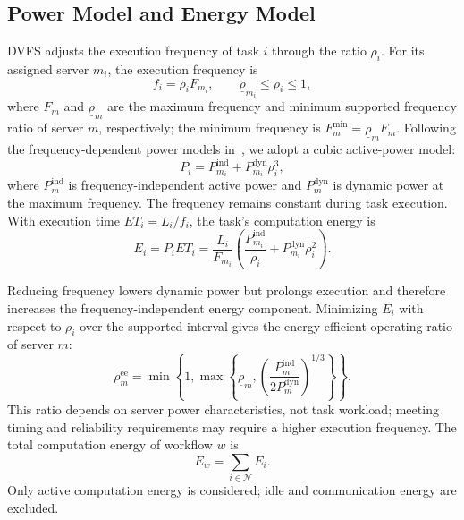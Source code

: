 \documentclass[10pt,twocolumn]{article}
\begin{document}
\subsection{Power Model and Energy Model}
\label{subsec:energy_model}

DVFS adjusts the execution frequency of task $i$ through the ratio
$\rho_i$. For its assigned server $m_i$, the execution frequency is
\begin{equation}
 f_i=\rho_iF_{m_i},\qquad \underline\rho_{m_i}\leq\rho_i\leq1,
 \label{eq:task_frequency}
\end{equation}
where $F_m$ and $\underline\rho_m$ are the maximum frequency and minimum
supported frequency ratio of server $m$, respectively; the minimum
frequency is $F_m^{\min}=\underline\rho_m F_m$.
Following the frequency-dependent power models
in~\cite{xie2017energy,zhu2006energy}, we adopt a cubic active-power model:
\begin{equation}
 P_i=P_{m_i}^{\mathrm{ind}}+P_{m_i}^{\mathrm{dyn}}\rho_i^3,
 \label{eq:task_power}
\end{equation}
where $P_m^{\mathrm{ind}}$ is frequency-independent active power and
$P_m^{\mathrm{dyn}}$ is dynamic power at the maximum frequency.
The frequency remains constant during task execution. With execution
time $ET_i=L_i/f_i$, the task's computation energy is
\begin{equation}
 E_i=P_iET_i
 =\frac{L_i}{F_{m_i}}\left(
 \frac{P_{m_i}^{\mathrm{ind}}}{\rho_i}
 +P_{m_i}^{\mathrm{dyn}}\rho_i^2\right).
 \label{eq:task_energy}
\end{equation}

Reducing frequency lowers dynamic power but prolongs execution and
therefore increases the frequency-independent energy component.
Minimizing $E_i$ with respect to $\rho_i$ over the supported interval gives
the energy-efficient operating ratio of server $m$:
\begin{equation}
 \rho_m^{\mathrm{ee}}=\min\!\left\{1,\max\!\left\{
 \underline\rho_m,
 \left(\frac{P_m^{\mathrm{ind}}}{2P_m^{\mathrm{dyn}}}\right)^{1/3}
 \right\}\right\}.
 \label{eq:rhoee}
\end{equation}
This ratio depends on server power characteristics, not task workload;
meeting timing and reliability requirements may require a higher
execution frequency.
The total computation energy of workflow $w$ is
\begin{equation}
 E_w=\sum_{i\in\mathcal N}E_i.
 \label{eq:workflow_energy}
\end{equation}
Only active computation energy is considered; idle and communication
energy are excluded.
\end{document}
